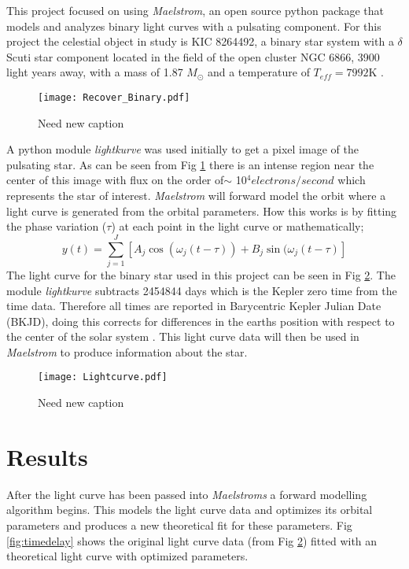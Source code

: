 \documentclass[]{article}
\begin{document}
This project focused on using \textit{Maelstrom}, an open source python package that models and analyzes binary light curves with a pulsating component. For this project the celestial object in study is KIC 8264492, a binary star system with a $\delta$ Scuti star component located in the field of the open cluster NGC 6866, 3900 light years away, with a mass of 1.87 $M_{\odot}$ and a temperature of $T_{eff} = 7992$K \cite{balona2013pulsation,shibahashi2015fm}. 

\begin{figure}[H]
    \centering
    \texttt{[image: Recover\_Binary.pdf]}
      \caption{Need new caption}
      \label{fig:Recover_Binary}
    \end{figure}


A python module \textit{lightkurve} was used initially to get a pixel image of the pulsating star.  As can be seen from Fig \ref{fig:Recover_Binary} there is an intense region near the center of this image with flux on the order of$\sim$ 10$^4 electrons/second$ which represents the star of interest. \textit{Maelstrom} will forward model the orbit where a light curve is generated from the orbital parameters. How this works is by fitting the phase variation ($\tau$) at each point in the light curve or mathematically;
\begin{equation}
    y(t) = \sum_{j = 1}^{J} [A_j \cos(\omega_j (t - \tau)) + B_j \sin(\omega_j (t - \tau) ]
\end{equation}
\noindent
The light curve for the binary star used in this project can be seen in Fig \ref{fig:Lightcurve}. The module \textit{lightkurve} subtracts 2454844 days which is the Kepler zero time from the time data. Therefore all times are reported in Barycentric Kepler Julian Date (BKJD), doing this corrects for differences in the earths position with respect to the center of the solar system \cite{Eastman_2010}. This light curve data will then be used in \textit{Maelstrom} to produce information about the star.

\begin{figure}[H]
    \centering
    \texttt{[image: Lightcurve.pdf]}
      \caption{Need new caption}
      \label{fig:Lightcurve}
\end{figure}


\section{Results}
After the light curve has been passed into \textit{Maelstroms} a forward modelling algorithm begins. This models the light curve data and optimizes its orbital parameters and produces a new theoretical fit for these parameters. Fig \ref{fig:timedelay} shows the original light curve data (from Fig \ref{fig:Lightcurve}) fitted with an theoretical light curve with optimized parameters.
\end{document}
